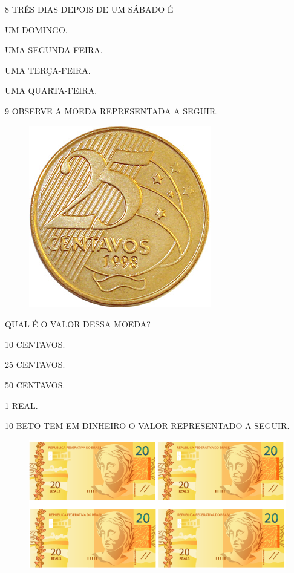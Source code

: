 \num{8} TRÊS DIAS DEPOIS DE UM SÁBADO É

\begin{escolha}[itemsep=0pt]
\item UM DOMINGO.

\item UMA SEGUNDA-FEIRA.

\item UMA TERÇA-FEIRA.

\item UMA QUARTA-FEIRA.
\end{escolha}

\num{9} OBSERVE A MOEDA REPRESENTADA A SEGUIR.

\begin{figure}[H]
\centering
\includegraphics[width=.2\textwidth]{./media/SAEB_1ANO_MAT_FIGURA132.png}
\end{figure}

QUAL É O VALOR DESSA MOEDA?

\begin{multicols}{2}
\begin{escolha}[itemsep=0pt]
\item 10 CENTAVOS.

\item 25 CENTAVOS.

\item 50 CENTAVOS.

\item 1 REAL.
\end{escolha}
\end{multicols}



\num{10} BETO TEM EM DINHEIRO O VALOR REPRESENTADO A SEGUIR.

\begin{figure}[H]
\centering
\includegraphics[width=\textwidth]{./media/SAEB_1ANO_MAT_FIGURA133b.png}
\end{figure}

